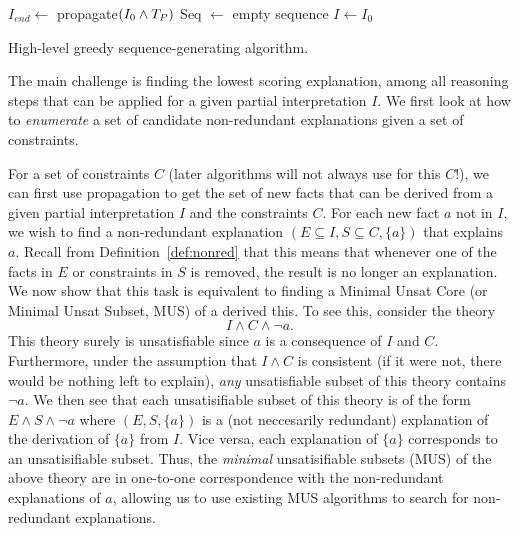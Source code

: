 \begin{algorithm}
$I_{end} \gets$ propagate$(I_0\land T_P)$\;
Seq $\gets$ empty sequence\;
$I \gets I_0$\;
\caption{High-level greedy sequence-generating algorithm.}
\label{alg:main}
\end{algorithm}
The main challenge is finding the lowest scoring explanation, among all reasoning steps that can be applied for a given partial interpretation $I$. We first look at how to \textit{enumerate} a set of candidate non-redundant explanations given a set of constraints.

For a set of constraints $C$ (later algorithms will not always use \allconstraints for this $C$!), we can first use propagation to get the set of new facts that can be derived from a given partial interpretation $I$ and the constraints $C$. For each new fact $a$ not in $I$, we wish to find a non-redundant explanation $(E \subseteq I, S \subseteq C,\{a\})$ that explains $a$. Recall from Definition~\ref{def:nonred} that this means that whenever one of the facts in $E$ or constraints in $S$ is removed, the result is no longer an explanation. 
We now show that this task is equivalent to finding a Minimal Unsat Core (or Minimal Unsat Subset, MUS) of a derived this.
To see this, consider the theory 
\[ I\wedge C \wedge \lnot a.\]
This theory surely is unsatisfiable since $a$ is a consequence of $I$ and $C$. 
Furthermore, under the assumption that $I\wedge C$ is consistent (if it were not, there would be nothing left to explain), 
\emph{any} unsatisfiable subset of this theory contains $\lnot a$.
We then see that each unsatisifiable subset of this theory is of the form $E \wedge S \wedge \lnot a$ where $(E,S,\{a\})$ is a (not neccesarily redundant) explanation of the derivation of $\{a\}$ from $I$. 
Vice versa, each explanation of $\{a\}$ corresponds to an unsatisifiable subset. Thus, the \emph{minimal} unsatisifiable subsets (MUS) of the above theory are in one-to-one correspondence with the non-redundant explanations of $a$, allowing us to use existing MUS algorithms to search for non-redundant explanations. 



